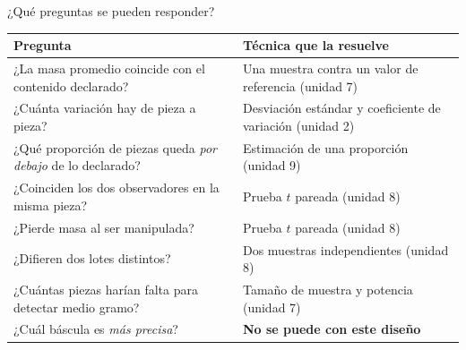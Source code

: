 \begin{frame}{¿Qué preguntas se pueden responder?}
  \centering
  {\small
  \begin{tabular}{@{}p{7.2cm}p{4.8cm}@{}}
    \toprule
    \textbf{Pregunta} & \textbf{Técnica que la resuelve} \\
    \midrule
    ¿La masa promedio coincide con el contenido declarado? &
      Una muestra contra un valor de referencia {\scriptsize\color{grisT}(unidad 7)} \\
    ¿Cuánta variación hay de pieza a pieza? &
      Desviación estándar y coeficiente de variación {\scriptsize\color{grisT}(unidad 2)} \\
    ¿Qué proporción de piezas queda \emph{por debajo} de lo declarado? &
      Estimación de una proporción {\scriptsize\color{grisT}(unidad 9)} \\
    ¿Coinciden los dos observadores en la misma pieza? &
      Prueba $t$ pareada {\scriptsize\color{grisT}(unidad 8)} \\
    ¿Pierde masa al ser manipulada? &
      Prueba $t$ pareada {\scriptsize\color{grisT}(unidad 8)} \\
    ¿Difieren dos lotes distintos? &
      Dos muestras independientes {\scriptsize\color{grisT}(unidad 8)} \\
    ¿Cuántas piezas harían falta para detectar medio gramo? &
      Tamaño de muestra y potencia {\scriptsize\color{grisT}(unidad 7)} \\
    \midrule
    \textcolor{rojoAc}{¿Cuál báscula es \emph{más precisa}?} &
      \textcolor{rojoAc}{\textbf{No se puede con este diseño}} \\
    \bottomrule
  \end{tabular}}
  \vspace{0.3cm}

  \raggedright
\end{frame}
